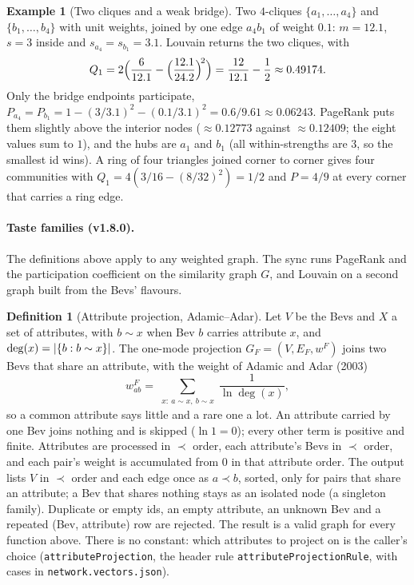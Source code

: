 \documentclass[11pt]{article}
\DeclarePairedDelimiter\abs{\lvert}{\rvert}
\newcommand{\code}[1]{\texttt{#1}}
\theoremstyle{plain}
\theoremstyle{definition}
\newtheorem{definition}[theorem]{Definition}
\newtheorem{example}[theorem]{Example}
\theoremstyle{remark}
\begin{document}
\begin{example}[Two cliques and a weak bridge]\label{ex:cliques}
Two $4$-cliques $\{a_1, \dots, a_4\}$ and $\{b_1, \dots, b_4\}$ with unit weights, joined by one edge $a_4 b_1$ of weight $0.1$: $m = 12.1$, $s = 3$ inside and $s_{a_4} = s_{b_1} = 3.1$. Louvain returns the two cliques, with
\[
Q_1 = 2\Bigl(\frac{6}{12.1} - \Bigl(\frac{12.1}{24.2}\Bigr)^{\!2}\Bigr) = \frac{12}{12.1} - \frac12 \approx 0.49174.
\]
Only the bridge endpoints participate, $P_{a_4} = P_{b_1} = 1 - (3/3.1)^2 - (0.1/3.1)^2 = 0.6/9.61 \approx 0.06243$. PageRank puts them slightly above the interior nodes ($\approx 0.12773$ against $\approx 0.12409$; the eight values sum to $1$), and the hubs are $a_1$ and $b_1$ (all within-strengths are $3$, so the smallest id wins). A ring of four triangles joined corner to corner gives four communities with $Q_1 = 4(3/16 - (8/32)^2) = 1/2$ and $P = 4/9$ at every corner that carries a ring edge.
\end{example}

\paragraph{Taste families (v1.8.0).} The definitions above apply to any weighted graph. The sync runs PageRank and the participation coefficient on the similarity graph $G$, and Louvain on a second graph built from the Bevs' flavours.

\begin{definition}[Attribute projection, Adamic--Adar]\label{def:projection}
Let $V$ be the Bevs and $X$ a set of attributes, with $b \sim x$ when Bev $b$ carries attribute $x$, and $\deg(x) = \abs{\{ b : b \sim x \}}$. The one-mode projection $G_F = (V, E_F, w^F)$ joins two Bevs that share an attribute, with the weight of Adamic and Adar (2003)
\begin{equation}\label{eq:projection}
w^F_{ab} = \sum_{\substack{x:\ a \sim x,\ b \sim x}} \frac{1}{\ln \deg(x)} ,
\end{equation}
so a common attribute says little and a rare one a lot. An attribute carried by one Bev joins nothing and is skipped ($\ln 1 = 0$); every other term is positive and finite. Attributes are processed in $\prec$ order, each attribute's Bevs in $\prec$ order, and each pair's weight is accumulated from $0$ in that attribute order. The output lists $V$ in $\prec$ order and each edge once as $a \prec b$, sorted, only for pairs that share an attribute; a Bev that shares nothing stays as an isolated node (a singleton family). Duplicate or empty ids, an empty attribute, an unknown Bev and a repeated (Bev, attribute) row are rejected. The result is a valid graph for every function above. There is no constant: which attributes to project on is the caller's choice (\code{attributeProjection}, the header rule \code{attributeProjectionRule}, with cases in \code{network.vectors.json}).
\end{definition}
\end{document}
